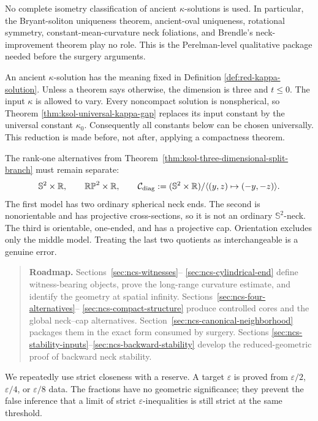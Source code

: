 \documentclass[10pt]{coll-l}
\newcommand{\R}{\mathbb{R}}
\newcommand{\Sph}{\mathbb{S}}
\newenvironment{roadmap}[1]{%
  \begin{quote}\small\noindent\textbf{Roadmap.} #1\par\medskip\noindent
}{\end{quote}}
\theoremstyle{definition}
\theoremstyle{remark}
\numberwithin{section}{chapter}
\numberwithin{equation}{chapter}
\begin{document}
No complete isometry classification of ancient $\kappa$-solutions is used.
In particular, the Bryant-soliton uniqueness theorem, ancient-oval
uniqueness, rotational symmetry, constant-mean-curvature neck foliations,
and Brendle's neck-improvement theorem play no role.  This is the
Perelman-level qualitative package needed before the surgery arguments.

An ancient $\kappa$-solution has the meaning fixed in Definition
\ref{def:red-kappa-solution}.  Unless a theorem says otherwise, the
dimension is three and $t\leq0$.  The input $\kappa$ is allowed to vary.
Every noncompact solution is nonspherical, so Theorem
\ref{thm:ksol-universal-kappa-gap} replaces its input constant by the
universal constant $\kappa _0$.  Consequently all constants below can be
chosen universally.  This reduction is made before, not after, applying a
compactness theorem.

The rank-one alternatives from
Theorem~\ref{thm:ksol-three-dimensional-split-branch} must remain separate:
\begin{equation}
 \Sph^2\times\R,\qquad
 \mathbb{RP}^2\times\R,\qquad
 \mathcal C_{\rm diag}:=
 (\Sph^2\times\R)/\langle(y,z)\mapsto(-y,-z)\rangle .
                                                        \label{eq:ncs-three-cylinder-models}
\end{equation}
The first model has two ordinary spherical neck ends.  The second is
nonorientable and has projective cross-sections, so it is not an ordinary
$\Sph^2$-neck.  The third is orientable, one-ended, and has a projective
cap.  Orientation excludes only the middle model.  Treating the last two
quotients as interchangeable is a genuine error.

\begin{roadmap}{Sections~\ref{sec:ncs-witnesses}--
\ref{sec:ncs-cylindrical-end} define witness-bearing objects, prove the
long-range curvature estimate, and identify the geometry at spatial
infinity.  Sections~\ref{sec:ncs-four-alternatives}--
\ref{sec:ncs-compact-structure} produce controlled cores and the global
neck--cap alternatives.  Section~\ref{sec:ncs-canonical-neighborhood}
packages them in the exact form consumed by surgery.  Sections
\ref{sec:ncs-stability-inputs}--\ref{sec:ncs-backward-stability} develop the
reduced-geometric proof of backward neck stability.}
\end{roadmap}

We repeatedly use strict closeness with a reserve.  A target
$\varepsilon$ is proved from $\varepsilon/2$, $\varepsilon/4$, or
$\varepsilon/8$ data.  The fractions have no geometric significance; they
prevent the false inference that a limit of strict
$\varepsilon$-inequalities is still strict at the same threshold.
\end{document}
